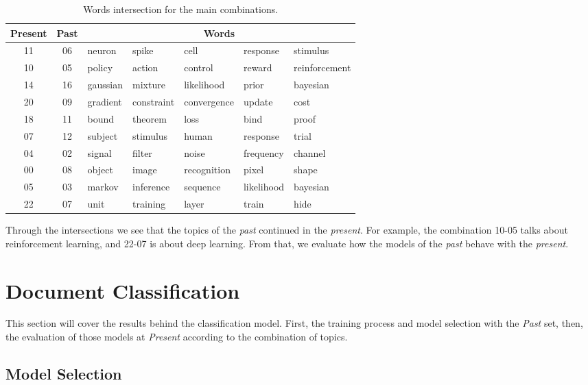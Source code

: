 \begin{table}[h!]
	\centering
	\caption{Words intersection for the main combinations.}
	\label{tab:correspondence-words}
	\begin{tabular}{cc|lllll}
		\toprule
		\textbf{Present} & \textbf{Past} & \multicolumn{5}{c}{\textbf{Words}} \\ \midrule
		11 & 06 & neuron   & spike      & cell        & response   & stimulus      \\
		10 & 05 & policy   & action     & control     & reward     & reinforcement \\
		14 & 16 & gaussian & mixture    & likelihood  & prior      & bayesian      \\
		20 & 09 & gradient & constraint & convergence & update     & cost          \\
		18 & 11 & bound    & theorem    & loss        & bind       & proof         \\
		07 & 12 & subject  & stimulus   & human       & response   & trial         \\
		04 & 02 & signal   & filter     & noise       & frequency  & channel       \\
		00 & 08 & object   & image      & recognition & pixel      & shape         \\
		05 & 03 & markov   & inference  & sequence    & likelihood & bayesian      \\
		22 & 07 & unit     & training   & layer       & train      & hide          \\ \bottomrule
	\end{tabular}
\end{table}

Through the intersections we see that the topics of the \textit{past} continued in the \textit{present}. For example, the combination 10-05 talks about reinforcement learning, and 22-07 is about deep learning. From that, we evaluate how the models of the \textit{past} behave with the \textit{present}.

\section{Document Classification}

This section will cover the results behind the classification model. First, the training process and model selection with the \textit{Past} set, then, the evaluation of those models at \textit{Present} according to the combination of topics.

\subsection{Model Selection}

